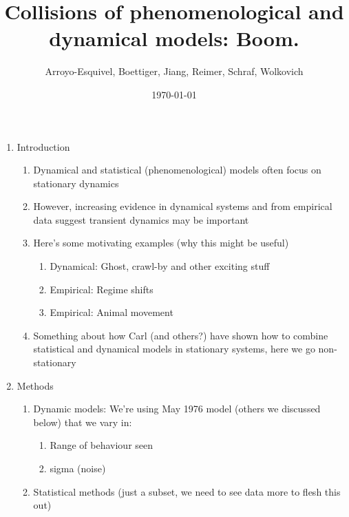 \documentclass[11pt,letter]{article}
\begin{document}

\renewcommand{\refname}{\CHead{}}

\title{Collisions of phenomenological and dynamical models: Boom.}
\author{Arroyo-Esquivel, Boettiger, Jiang, Reimer, Schraf, Wolkovich}
\date{\today}
\maketitle

\begin{enumerate}
\item Introduction
\begin{enumerate} %
\item Dynamical and statistical (phenomenological) models often focus on stationary dynamics 
\item However, increasing evidence in dynamical systems and from empirical data suggest transient dynamics may be important
\item Here's some motivating examples (why this might be useful)
\begin{enumerate}
\item Dynamical: Ghost, crawl-by and other exciting stuff
\item Empirical: Regime shifts
\item Empirical: Animal movement 
\end{enumerate}
\item Something about how Carl (and others?) have shown how to combine statistical and dynamical models in stationary systems, here we go non-stationary
\end{enumerate}
\item Methods
\begin{enumerate}
\item Dynamic models: We're using May 1976 model (others we discussed below) that we vary in:
\begin{enumerate}
\item Range of behaviour seen
\item sigma (noise)
\end{enumerate}
\item Statistical methods (just a subset, we need to see data more to flesh this out)
\begin{enumerate}

\end{enumerate}
\end{enumerate}
\end{enumerate}
\end{document}
